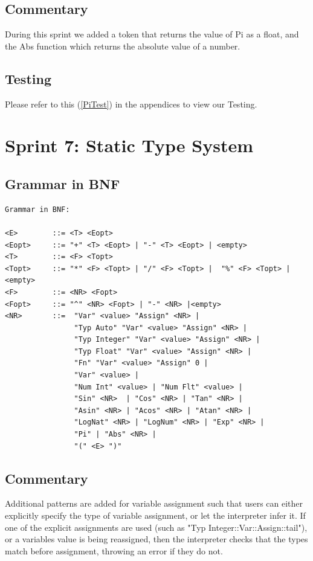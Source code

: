 \documentclass[a4paper, oneside, 11pt]{report}
\begin{document}
\subsection{Commentary}
During this sprint we added a token that returns the value of Pi as a float, and the Abs function which returns the absolute value of a number.


\subsection{Testing}
Please refer to this (\ref{PiTest}) in the appendices to view our Testing. \\


\clearpage
\section{Sprint 7: Static Type System}
\subsection{Grammar in BNF}
\begin{verbatim}
Grammar in BNF:

<E>        ::= <T> <Eopt>
<Eopt>     ::= "+" <T> <Eopt> | "-" <T> <Eopt> | <empty>
<T>        ::= <F> <Topt>
<Topt>     ::= "*" <F> <Topt> | "/" <F> <Topt> |  "%" <F> <Topt> |<empty>
<F>        ::= <NR> <Fopt>
<Fopt>     ::= "^" <NR> <Fopt> | "-" <NR> |<empty> 
<NR>       ::=  "Var" <value> "Assign" <NR> |
                "Typ Auto" "Var" <value> "Assign" <NR> |
                "Typ Integer" "Var" <value> "Assign" <NR> |
                "Typ Float" "Var" <value> "Assign" <NR> |
                "Fn" "Var" <value> "Assign" 0 |
                "Var" <value> |
                "Num Int" <value> | "Num Flt" <value> |
                "Sin" <NR>  | "Cos" <NR> | "Tan" <NR> |
                "Asin" <NR> | "Acos" <NR> | "Atan" <NR> |
                "LogNat" <NR> | "LogNum" <NR> | "Exp" <NR> |
                "Pi" | "Abs" <NR> |
                "(" <E> ")"
\end{verbatim}
\subsection{Commentary}
Additional patterns are added for variable assignment such that users can either explicitly specify the type of variable assignment, or let the interpreter infer it. 
If one of the explicit assignments are used (such as "Typ Integer::Var::Assign::tail"), or a variables value is being reassigned, then the interpreter checks that the types match before assignment, throwing an error if they do not.
\end{document}
